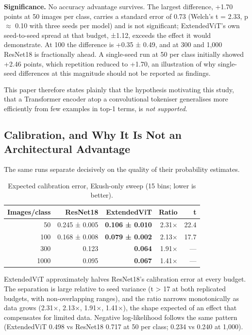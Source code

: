 \textbf{Significance.} No accuracy advantage survives. The largest difference, +1.70
points at 50 images per class, carries a standard error of 0.73 (Welch's t = 2.33, p \ensuremath{\approx} 0.10 with three seeds per model) and is not significant; ExtendedViT's own
seed-to-seed spread at that budget, ±1.12, exceeds the effect it would
demonstrate. At 100 the difference is +0.35 ± 0.49, and at 300 and 1,000
ResNet18 is fractionally ahead. A single-seed run at 50 per class
initially showed +2.46 points, which repetition reduced to +1.70, an
illustration of why single-seed differences at this magnitude should not
be reported as findings.

This paper therefore states plainly that the hypothesis motivating this study,
that a Transformer encoder atop a convolutional tokeniser generalises
more efficiently from few examples in top-1 terms, is \emph{not
supported}.

\hypertarget{calibration-and-why-it-is-not-an-architectural-advantage}{%
\subsection{Calibration, and Why It Is Not an Architectural
Advantage}\label{calibration-and-why-it-is-not-an-architectural-advantage}}

The same runs separate decisively on the quality of their probability
estimates.

\begin{table}[htbp]
\centering
\footnotesize
\caption{Expected calibration error, Ekush-only sweep (15 bins;
lower is better).}
\begin{tabular}{rrrrr}
\toprule
Images/class & ResNet18 & Extended\-Vi\-T & Ratio & t \\
\midrule
50 & 0.245 ± 0.005 & \textbf{0.106 ± 0.010} & 2.31× & 22.4 \\
100 & 0.168 ± 0.008 & \textbf{0.079 ± 0.002} & 2.13× & 17.7 \\
300 & 0.123 & \textbf{0.064} & 1.91× & --- \\
1000 & 0.095 & \textbf{0.067} & 1.41× & --- \\
\bottomrule
\end{tabular}
\end{table}


ExtendedViT approximately halves ResNet18's calibration error at every
budget. The separation is large relative to seed variance (t
\textgreater{} 17 at both replicated budgets, with non-overlapping
ranges), and the ratio narrows monotonically as data grows (2.31×,
2.13×, 1.91×, 1.41×), the shape expected of an effect that compensates
for limited data. Negative log-likelihood follows the same pattern
(ExtendedViT 0.498 vs ResNet18 0.717 at 50 per class; 0.234 vs 0.240 at 1,000).

